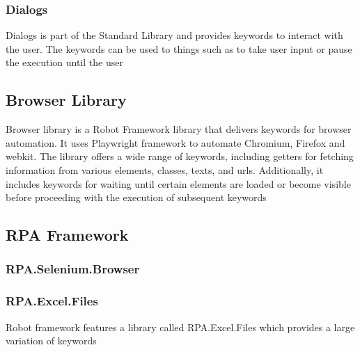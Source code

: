 \subsubsection{Dialogs}
Dialogs is part of the Standard Library and provides keywords to interact with the user. The keywords can be used to things such as to take user input or pause the execution until the user 
\subsection{Browser Library}
Browser library is a Robot Framework library that delivers keywords for browser automation.
It uses Playwright framework to automate Chromium, Firefox and webkit.
The library offers a wide range of keywords, including getters for fetching information from various elements, classes, texts, and \gls{url}s.
Additionally, it includes keywords for waiting until certain elements are loaded or become visible before proceeding with the execution of subsequent keywords
\subsection{RPA Framework}
\subsubsection{RPA.Selenium.Browser}
\subsubsection{RPA.Excel.Files}
Robot framework features a library called RPA.Excel.Files which provides a large variation of keywords
\cite{robot-framework:standard-library}
\cite{robot_framework:builtin_library}
\cite{robot_framework:dialogs_library}
\cite{robot_framework:browser_library}
\clearpage %
